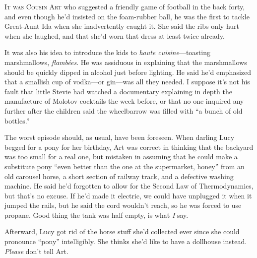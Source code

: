 
\lettrine{I}{t was Cousin Art} who suggested a friendly game of football in the back
forty, and even though he'd insisted on the foam-rubber ball, he was the
first to tackle Great-Aunt Ida when she inadvertently caught it. She
said the ribs only hurt when she laughed, and that she'd worn that dress
at least twice already.

It was also his idea to introduce the kids to \emph{haute
cuisine}---toasting marshmallows, \emph{flambées}. He was assiduous in
explaining that the marshmallows should be quickly dipped in alcohol
just before lighting. He said he'd emphasized that a smallish cup of
vodka---or gin---was all they needed. I suppose it's not his fault that
little Stevie had watched a documentary explaining in depth the
manufacture of Molotov cocktails the week before, or that no one
inquired any further after the children said the wheelbarrow was filled
with ``a bunch of old bottles.''

The worst episode should, as usual, have been foreseen. When darling
Lucy begged for a pony for her birthday, Art was correct in thinking
that the backyard was too small for a real one, but mistaken in assuming
that he could make a substitute pony ``even better than the one at the
supermarket, honey'' from an old carousel horse, a short section of
railway track, and a defective washing machine. He said he'd forgotten
to allow for the Second Law of Thermodynamics, but that's no excuse. If
he'd made it electric, we could have unplugged it when it jumped the
rails, but he said the cord wouldn't reach, so he was forced to use
propane. Good thing the tank was half empty, is what \emph{I} say.

Afterward, Lucy got rid of the horse stuff she'd collected ever since
she could pronounce ``pony'' intelligibly. She thinks she'd like to have
a dollhouse instead. \emph{Please} don't tell Art.

